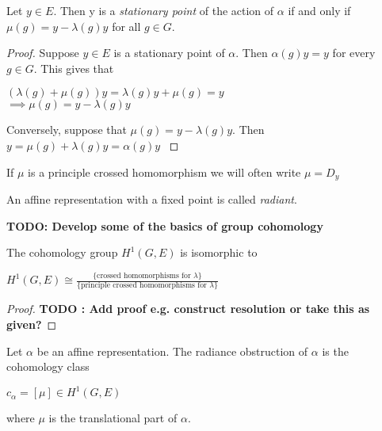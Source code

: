 \begin{prop}
    Let $y\in E$. Then y is a \textit{stationary point} of the action of $\alpha$ if
    and only if $\mu(g) = y - \lambda(g)y$ for all $g \in G$.
\end{prop}

\begin{proof}
    Suppose $y \in E$ is a stationary point of $\alpha$. Then $\alpha(g)y = y$ for every $g \in G$.
    This gives that
    \begin{center}
        $(\lambda(g) + \mu(g))y = \lambda(g)y + \mu(g) = y$\\
        $ \implies \mu(g) = y - \lambda(g)y$
    \end{center}

    Conversely, suppose that $\mu(g) = y - \lambda(g)y$. Then $y = \mu(g) +
        \lambda(g)y = \alpha(g)y$ \label{lemma:stationary}
\end{proof}
\begin{remark}
    If $\mu$ is a principle crossed homomorphism we will often write $\mu = D_y$
\end{remark}

\begin{remark}
    An affine representation with a fixed point is called \textit{radiant}.
\end{remark}

\textbf{TODO: Develop some of the basics of group cohomology}

\begin{lemma}
    The cohomology group $H^1(G, E)$ is isomorphic to
    \begin{center}
        $H^1(G,E) \cong \frac{\{\text{crossed homomorphisms for } \lambda\}}{\{\text{principle crossed homomorphisms for } \lambda\}}$
    \end{center}
\end{lemma}

\begin{proof}
    \textbf{TODO : Add proof e.g. construct resolution or take this as given?}
\end{proof}

\begin{definition}
    Let $\alpha$ be an affine representation. The radiance obstruction of $\alpha$ is the cohomology
    class
    \begin{center}
        $c_{\alpha} = [\mu] \in H^1(G, E)$
    \end{center}
    where $\mu$ is the translational part of $\alpha$.
\end{definition}

